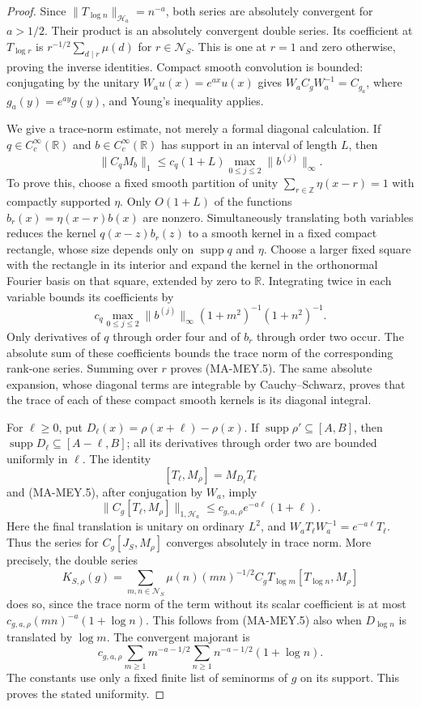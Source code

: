 \begin{proof}
Since $\|T_{\log n}\|_{\mathcal H_a}=n^{-a}$, both series are
absolutely convergent for $a>1/2$.  Their product is an absolutely
convergent double series.  Its coefficient at $T_{\log r}$ is
$r^{-1/2}\sum_{d\mid r}\mu(d)$ for $r\in\mathcal N_S$.
This is one at $r=1$ and zero otherwise, proving the inverse
identities.  Compact smooth convolution is bounded: conjugating by
the unitary $W_a u(x)=e^{ax}u(x)$ gives
$W_aC_gW_a^{-1}=C_{g_a}$, where $g_a(y)=e^{ay}g(y)$, and
Young's inequality applies.

We give a trace-norm estimate, not merely a formal diagonal
calculation.  If $q\in C_c^\infty(\mathbb R)$ and
$b\in C_c^\infty(\mathbb R)$ has support in an interval of length
$L$, then
\[
 \|C_qM_b\|_1\le
 c_q(1+L)\max_{0\le j\le2}\|b^{(j)}\|_\infty.
 \tag{MA-MEY.5}
\]
To prove this, choose a fixed smooth partition of unity
$\sum_{r\in\mathbb Z}\eta(x-r)=1$ with compactly supported
$\eta$.  Only $O(1+L)$ of the functions
$b_r(x)=\eta(x-r)b(x)$ are nonzero.  Simultaneously translating
both variables reduces the kernel
$q(x-z)b_r(z)$ to a smooth kernel in a fixed compact rectangle,
whose size depends only on $\operatorname{supp}q$ and $\eta$.
Choose a larger fixed square with the rectangle in its interior
and expand the kernel in the orthonormal Fourier basis on that
square, extended by zero to $\mathbb R$.  Integrating twice in
each variable bounds its coefficients by
\[
 c_q\max_{0\le j\le2}\|b^{(j)}\|_\infty
 (1+m^2)^{-1}(1+n^2)^{-1}.
\]
Only derivatives of $q$ through order four and of $b_r$ through
order two occur.  The absolute sum of these coefficients bounds
the trace norm of the corresponding rank-one series.  Summing
over $r$ proves (MA-MEY.5).  The same absolute expansion, whose
diagonal terms are integrable by Cauchy--Schwarz, proves that the
trace of each of these compact smooth kernels is its diagonal
integral.

For $\ell\ge0$, put
$D_\ell(x)=\rho(x+\ell)-\rho(x)$.  If
$\operatorname{supp}\rho'\subseteq[A,B]$, then
$\operatorname{supp}D_\ell\subseteq[A-\ell,B]$;
all its derivatives through order two are bounded uniformly in
$\ell$.  The identity
\[
 [T_\ell,M_\rho]=M_{D_\ell}T_\ell
\]
and (MA-MEY.5), after conjugation by $W_a$, imply
\[
 \|C_g[T_\ell,M_\rho]\|_{1,\mathcal H_a}
       \le c_{g,a,\rho}e^{-a\ell}(1+\ell).
 \tag{MA-MEY.6}
\]
Here the final translation is unitary on ordinary $L^2$, and
$W_aT_\ell W_a^{-1}=e^{-a\ell}T_\ell$.
Thus the series for $C_g[J_S,M_\rho]$ converges absolutely in
trace norm.  More precisely, the double series
\[
 K_{S,\rho}(g)
  =\sum_{m,n\in\mathcal N_S}
       \mu(n)(mn)^{-1/2}
       C_gT_{\log m}[T_{\log n},M_\rho]
 \tag{MA-MEY.7}
\]
does so, since the trace norm of the term without its scalar
coefficient is at most
$c_{g,a,\rho}(mn)^{-a}(1+\log n)$.  This follows from
(MA-MEY.5) also when $D_{\log n}$ is translated by $\log m$.
The convergent majorant is
\[
 c_{g,a,\rho}
 \sum_{m\ge1}m^{-a-1/2}
 \sum_{n\ge1}n^{-a-1/2}(1+\log n).
\]
The constants use only a fixed finite list of seminorms of $g$
on its support.  This proves the stated uniformity.


\end{proof}
